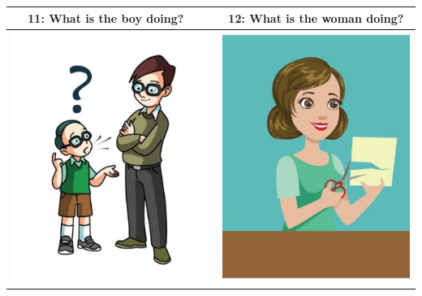 \documentclass[12pt,notitlepage]{article}
\begin{document}
\begin{center}
\begin{tabular}{|c|c|c|}
\hline
11: What is the boy doing? && 12: What is the woman doing? \\
\hline
\includegraphics[width=20em,trim=0 0 0 -3]{figures/I11.jpg} & & \includegraphics[width=20em,trim=0 0 0 -3]{figures/I12.jpg} \\
\hline
\end{tabular}
\vspace{1em} \\



\end{center}
\end{document}
